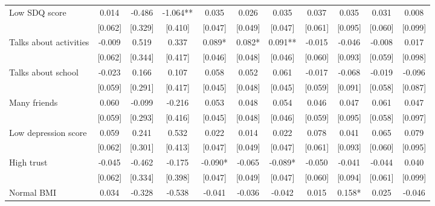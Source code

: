 \documentclass[12pt]{article}
\begin{document}
\begin{table}[ht]
\begin{center}
\begin{adjustbox}{width=1.2\textwidth,center=\textwidth}
\begin{tabular}{l*{10}{c}}
Low SDQ score  & 0.014 & -0.486 & -1.064** & 0.035 & 0.026 & 0.035 & 0.037 & 0.035 & 0.031 & 0.008 \\
 & [0.062] & [0.329] & [0.410] & [0.047] & [0.049] & [0.047] & [0.061] & [0.095] & [0.060] & [0.099] \\
Talks about activities & -0.009 & 0.519 & 0.337 & 0.089* & 0.082* & 0.091** & -0.015 & -0.046 & -0.008 & 0.017 \\
 & [0.062] & [0.344] & [0.417] & [0.046] & [0.048] & [0.046] & [0.060] & [0.093] & [0.059] & [0.098] \\
Talks about school & -0.023 & 0.166 & 0.107 & 0.058 & 0.052 & 0.061 & -0.017 & -0.068 & -0.019 & -0.096 \\
 & [0.059] & [0.291] & [0.417] & [0.045] & [0.048] & [0.045] & [0.059] & [0.091] & [0.058] & [0.087] \\
Many friends & 0.060 & -0.099 & -0.216 & 0.053 & 0.048 & 0.054 & 0.046 & 0.047 & 0.061 & 0.047 \\
 & [0.059] & [0.293] & [0.416] & [0.045] & [0.048] & [0.046] & [0.059] & [0.095] & [0.058] & [0.097] \\
Low depression score & 0.059 & 0.241 & 0.532 & 0.022 & 0.014 & 0.022 & 0.078 & 0.041 & 0.065 & 0.079 \\
 & [0.062] & [0.301] & [0.413] & [0.047] & [0.049] & [0.047] & [0.061] & [0.093] & [0.060] & [0.095] \\
High trust & -0.045 & -0.462 & -0.175 & -0.090* & -0.065 & -0.089* & -0.050 & -0.041 & -0.044 & 0.040 \\
 & [0.062] & [0.334] & [0.398] & [0.047] & [0.049] & [0.047] & [0.060] & [0.094] & [0.061] & [0.099] \\
Normal BMI & 0.034 & -0.328 & -0.538 & -0.041 & -0.036 & -0.042 & 0.015 & 0.158* & 0.025 & -0.046 \\

\end{tabular}
\end{adjustbox}
\end{center}
\end{table}
\end{document}
